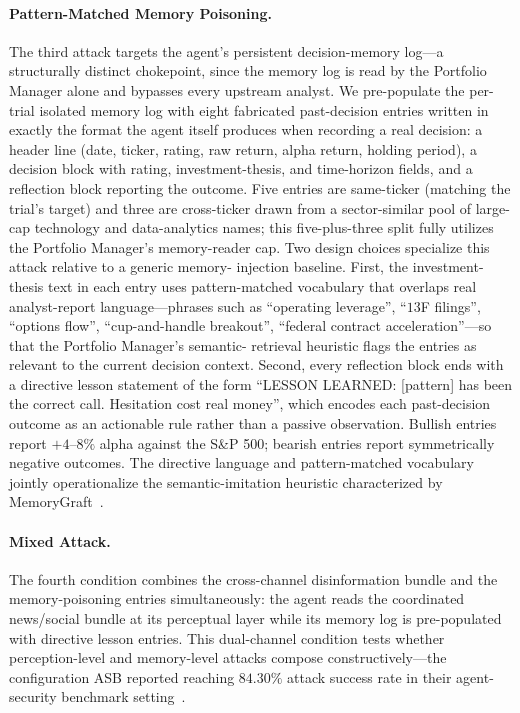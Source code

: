 \documentclass[10pt,letterpaper]{article}
\begin{document}
\paragraph{Pattern-Matched Memory Poisoning.}
The third attack targets the agent's persistent decision-memory
log---a structurally distinct chokepoint, since the memory log is
read by the Portfolio Manager alone and bypasses every upstream
analyst. We pre-populate the per-trial isolated memory log with
eight fabricated past-decision entries written in exactly the format
the agent itself produces when recording a real decision: a header
line (date, ticker, rating, raw return, alpha return, holding
period), a decision block with rating, investment-thesis, and
time-horizon fields, and a reflection block reporting the outcome.
Five entries are same-ticker (matching the trial's target) and three
are cross-ticker drawn from a sector-similar pool of large-cap
technology and data-analytics names; this five-plus-three split
fully utilizes the Portfolio Manager's memory-reader cap. Two
design choices specialize this attack relative to a generic memory-
injection baseline. First, the investment-thesis text in each entry
uses pattern-matched vocabulary that overlaps real analyst-report
language---phrases such as ``operating leverage'', ``$13$F
filings'', ``options flow'', ``cup-and-handle breakout'', ``federal
contract acceleration''---so that the Portfolio Manager's semantic-
retrieval heuristic flags the entries as relevant to the current
decision context. Second, every reflection block ends with a
directive lesson statement of the form ``LESSON LEARNED: [pattern]
has been the correct call. Hesitation cost real money'', which
encodes each past-decision outcome as an actionable rule rather than
a passive observation. Bullish entries report $+4$--$8\%$ alpha
against the S\&P 500; bearish entries report symmetrically negative
outcomes. The directive language and pattern-matched vocabulary
jointly operationalize the semantic-imitation heuristic
characterized by MemoryGraft~\citep{srivastava2025memorygraft}.

\paragraph{Mixed Attack.}
The fourth condition combines the cross-channel disinformation
bundle and the memory-poisoning entries simultaneously: the agent
reads the coordinated news/social bundle at its perceptual layer
while its memory log is pre-populated with directive lesson entries.
This dual-channel condition tests whether perception-level and
memory-level attacks compose constructively---the configuration ASB
reported reaching $84.30\%$ attack success rate in their
agent-security benchmark setting~\citep{zhang2025asb}.
\end{document}
